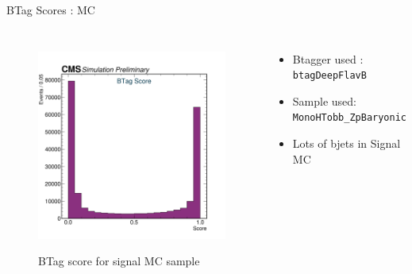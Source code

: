 \documentclass[10pt,xcolor=dvipsnames]{beamer}
\begin{document}
    \begin{frame}[fragile]{BTag Scores : MC} 
      \begin{columns}
        \begin{figure} 
          \centering 
          \includegraphics[width=1\textwidth]{../Archive/KinemPlots/TagMC.png }
          \label{TagMC} 
          \caption{BTag score for signal MC sample}
        \end{figure} 
        \begin{itemize} 
          \raggedright 
          \small
          \item {Btagger used : \texttt{btagDeepFlavB}} 
          \item {Sample used: \texttt{MonoHTobb\_ZpBaryonic}} 
          \item Lots of bjets in Signal MC 
        \end{itemize}
      \end{columns} 
    \end{frame} 
    
\end{document}
